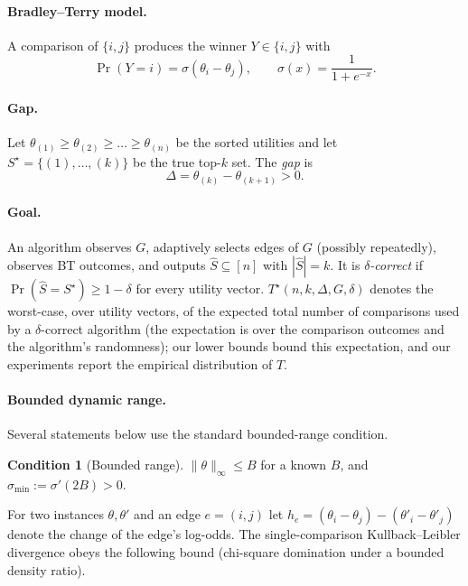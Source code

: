 \documentclass[11pt]{article}
\theoremstyle{definition}
\newtheorem{condition}[theorem]{Condition}
\begin{document}
\paragraph{Bradley--Terry model.}  A comparison of $\{i,j\}$ produces the winner $Y\in\{i,j\}$ with
\begin{equation}
\Pr(Y=i)=\sigma(\theta_i-\theta_j),\qquad \sigma(x)=\frac{1}{1+e^{-x}} .
\end{equation}

\paragraph{Gap.}  Let $\theta_{(1)}\ge\theta_{(2)}\ge\dots\ge\theta_{(n)}$ be the sorted utilities and let $S^\star=\{(1),\dots,(k)\}$ be the true top-$k$ set.  The \emph{gap} is
\begin{equation}
\Delta=\theta_{(k)}-\theta_{(k+1)} > 0 .
\end{equation}

\paragraph{Goal.}  An algorithm observes $G$, adaptively selects edges of $G$ (possibly repeatedly), observes BT outcomes, and outputs $\hat S\subseteq[n]$ with $|\hat S|=k$.  It is \emph{$\delta$-correct} if $\Pr(\hat S=S^\star)\ge 1-\delta$ for every utility vector.  $T^\star(n,k,\Delta,G,\delta)$ denotes the worst-case, over utility vectors, of the expected total number of comparisons used by a $\delta$-correct algorithm (the expectation is over the comparison outcomes and the algorithm's randomness); our lower bounds bound this expectation, and our experiments report the empirical distribution of $T$.

\paragraph{Bounded dynamic range.}  Several statements below use the standard bounded-range condition.

\begin{condition}[Bounded range]
\label{cond:range}
$\|\theta\|_\infty\le B$ for a known $B$, and $\sigma_{\min}:=\sigma'(2B)>0$.
\end{condition}

For two instances $\theta,\theta'$ and an edge $e=(i,j)$ let $h_e=(\theta_i-\theta_j)-(\theta'_i-\theta'_j)$ denote the change of the edge's log-odds.  The single-comparison Kullback--Leibler divergence obeys the following bound (chi-square domination under a bounded density ratio).
\end{document}
